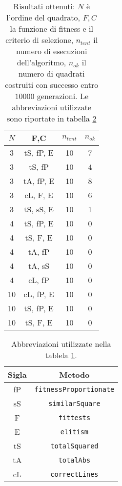 \documentclass[italian,twoside,twocolumn]{article}
\begin{document}
\begin{table}[htbp]
	\centering
	\caption{Risultati ottenuti: $ N $ è l'ordine del quadrato, $ F,C $ la funzione di fitness e il criterio di selezione, $ n_{tent} $ il numero di esecuzioni dell'algoritmo, $ n_{ok} $ il numero di quadrati costruiti con successo entro $ \num{10000} $ generazioni. Le abbreviazioni utilizzate sono riportate in tabella \ref{tab:abb} }
	\begin{tabular}{cc|cc}
		\hline
		$ N $ &    F,C    & $ n_{tent} $ & $ n_{ok} $ \\ \hline
		3   & tS, fP, E &      10      &     7      \\
		3   &  tS, fP   &      10      &     4      \\
		3   & tA, fP, E &      10      &     8      \\
		3   & cL, F, E  &      10      &     6      \\
		3   & tS, sS, E &      10      &     1      \\
		4   & tS, fP, E &      10      &     0      \\
		4   & tS, F, E  &      10      &     0      \\
		4   &  tA, fP   &      10      &     0      \\
		4   &  tA, sS   &      10      &     0      \\
		4   &  cL, fP   &      10      &     0      \\
		10   & cL, fP, E &      10      &     0      \\
		10   & tS, fP, E &      10      &     0      \\
		10   & tS, F, E  &      10      &     0      \\ \hline
	\end{tabular} 
	\label{tab:risultati_genetic}
\end{table}

\begin{table}[htbp]
	\centering
	\caption{Abbreviazioni utilizzate nella tablela \ref{tab:risultati_genetic}. }
	\begin{tabular}{c|c}
		Sigla &            Metodo             \\ \hline
		fP   & \texttt{fitnessProportionate} \\
		sS   &    \texttt{similarSquare}     \\
		F   &       \texttt{fittests}       \\
		E   &       \texttt{elitism}        \\
		tS   &     \texttt{totalSquared}     \\
		tA   &       \texttt{totalAbs}       \\
		cL   &     \texttt{correctLines}     \\ \hline
	\end{tabular} 
	\label{tab:abb}
\end{table}
\end{document}
